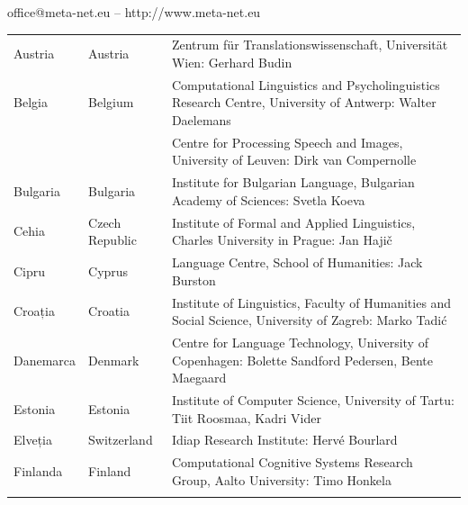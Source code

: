 \vfill
\centerline{office@meta-net.eu -- http://www.meta-net.eu}

\cleardoublepage

\appendix
{}



  
\cleardoublepage

\label{metanetmembers}

\small
\begin{longtable}{@{}llp{113mm}@{}}
  Austria & \textcolor{grey1}{Austria} & Zentrum für Translationswissenschaft, Universität Wien: Gerhard Budin\\ \addlinespace 
  Belgia & \textcolor{grey1}{Belgium} & Computational Linguistics and Psycholinguistics Research Centre, University of Antwerp: Walter Daelemans\\ \addlinespace
  & & Centre for Processing Speech and Images, University of Leuven: Dirk van Compernolle \\ \addlinespace
  Bulgaria & \textcolor{grey1}{Bulgaria} & Institute for Bulgarian Language, Bulgarian Academy of Sciences: Svetla Koeva \\ \addlinespace
  Cehia & \textcolor{grey1}{Czech Republic} & Institute of Formal and Applied Linguistics, Charles University in Prague: Jan Hajič \\ \addlinespace
  Cipru & \textcolor{grey1}{Cyprus} & Language Centre, School of Humanities: Jack Burston \\ \addlinespace
  Croația & \textcolor{grey1}{Croatia} & Institute of Linguistics, Faculty of Humanities and Social Science, University of Zagreb: Marko Tadić \\ \addlinespace
  Danemarca &  \textcolor{grey1}{Denmark} & Centre for Language Technology, University of Copenhagen: \newline Bolette Sandford Pedersen, Bente Maegaard\\ \addlinespace
  Estonia & \textcolor{grey1}{Estonia} & Institute of Computer Science, University of Tartu: Tiit Roosmaa, Kadri Vider\\ \addlinespace
  Elveția & \textcolor{grey1}{Switzerland} & Idiap Research Institute: Hervé Bourlard \\ \addlinespace 
  Finlanda & \textcolor{grey1}{Finland} & Computational Cognitive Systems Research Group, Aalto University: Timo Honkela\\ \addlinespace

\end{longtable}
